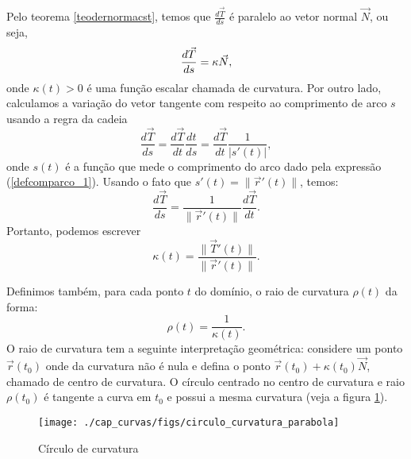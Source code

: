 Pelo teorema \ref{teodernormacst}, temos que $\frac{d \vec{T} }{ds}$ é paralelo ao vetor normal $\vec{N}$, ou seja,
\begin{equation}{\label{Frenet_1}}
\frac{d \vec{T} }{ds}=\kappa   \vec{N},
\end{equation}
onde $\kappa(t)>0$ é uma função escalar chamada de curvatura. Por outro lado, calculamos a variação do vetor tangente com respeito ao comprimento de arco $s$ usando a regra da cadeia
$$
\frac{d \vec{T} }{ds}=\frac{d \vec{T} }{dt}\frac{dt}{ds}=\frac{d \vec{T} }{dt}\frac{1}{|s'(t)|},
$$
onde $s(t)$ é a função que mede o comprimento do arco dado pela expressão (\ref{defcomparco_1}). Usando o fato que $s'(t)=\|\vec{r}'(t)\|$, temos:
$$
\frac{d \vec{T} }{ds}=\frac{1}{\|\vec{r}'(t)\|}\frac{d \vec{T} }{dt}.
$$
Portanto, podemos escrever
$$
\kappa(t)=\frac{\|\vec{T}'(t)\|}{\|\vec{r}'(t)\|}.
$$

Definimos também, para cada ponto $t$ do domínio, o raio de curvatura $\rho(t)$ da forma:
$$
\rho(t)=\frac{1}{\kappa(t)}.
$$
O raio de curvatura tem a seguinte interpretação geométrica: considere um ponto $\vec{r}(t_0)$ onde da curvatura não é nula e defina o ponto $\vec{r}(t_0)+\kappa(t_0)\vec{N}$, chamado de centro de curvatura. O círculo centrado no centro de curvatura e raio $\rho(t_0)$ é tangente a curva em $t_0$ e possui a mesma curvatura (veja a figura \ref{raio_de_curvatura}).


\begin{figure}
\begin{center}
    \texttt{[image: ./cap\_curvas/figs/circulo\_curvatura\_parabola]}
 \caption{Círculo de curvatura}\label{raio_de_curvatura}
  \end{center}
\end{figure}

